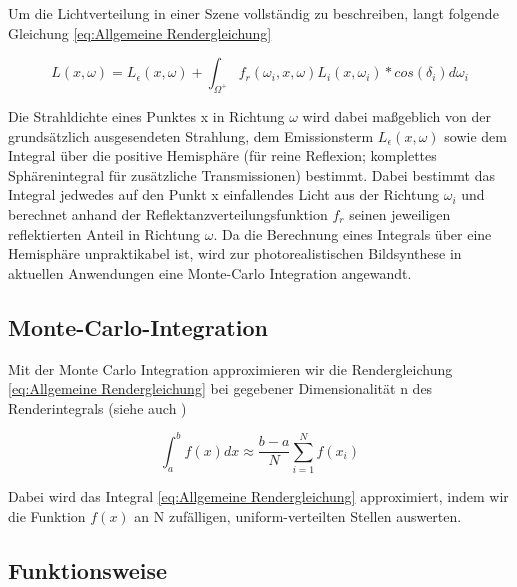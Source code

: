 Um die Lichtverteilung in einer Szene vollständig zu beschreiben, langt folgende Gleichung \ref{eq:Allgemeine Rendergleichung} \cite{kajiya1986rendering}

\begin{tcolorbox}[rightrule=3mm, rounded corners=east]
    \begin{equation}\label{eq:Allgemeine Rendergleichung}
        L(x,\omega) = L_{\epsilon}(x,\omega) + \int_{\Omega^{+}}f_{r}(\omega_{i},x,\omega)L_{i}(x,\omega_{i})*cos(\delta_{i})d\omega_{i}
    \end{equation}
\end{tcolorbox}

Die Strahldichte eines Punktes x in Richtung $\omega$ wird dabei maßgeblich von der grundsätzlich ausgesendeten Strahlung, dem Emissionsterm 
$L_{\epsilon}(x,\omega)$ sowie dem Integral über die positive Hemisphäre (für reine Reflexion; komplettes Sphärenintegral für zusätzliche 
Transmissionen) bestimmt. Dabei bestimmt das Integral jedwedes auf den Punkt x einfallendes Licht aus der Richtung $\omega_{i}$ und berechnet 
anhand der Reflektanzverteilungsfunktion $f_{r}$ seinen jeweiligen reflektierten Anteil in Richtung $\omega$. Da die Berechnung eines Integrals
über eine Hemisphäre unpraktikabel ist, wird zur photorealistischen Bildsynthese in aktuellen Anwendungen \cite{PathTracingInProduction} eine 
Monte-Carlo Integration angewandt.

\subsection{Monte-Carlo-Integration}
Mit der Monte Carlo Integration approximieren wir die Rendergleichung \ref{eq:Allgemeine Rendergleichung} bei gegebener Dimensionalität n des Renderintegrals 
(siehe auch \cite{KK02})

\begin{tcolorbox}[rightrule=3mm, rounded corners=east]
    \begin{equation}\label{eq:Monte-Carlo}
        \int_{a}^{b}f(x)dx \approx \frac{b-a}{N}\sum_{i=1}^{N}f(x_{i})
    \end{equation}
\end{tcolorbox}

Dabei wird das Integral \ref{eq:Allgemeine Rendergleichung} approximiert, indem wir die Funktion $f(x)$ an N zufälligen, uniform-verteilten
Stellen auswerten. 
\newpage 

\subsection{Funktionsweise}

